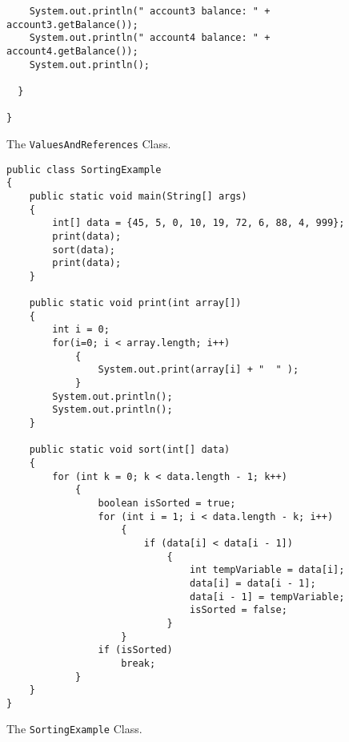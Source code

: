 \documentclass[12pt]{article}
\begin{document}
\begin{enumerate}
\begin{figure}[t]
{\begin{verbatim}
    System.out.println(" account3 balance: " + account3.getBalance());
    System.out.println(" account4 balance: " + account4.getBalance());
    System.out.println();

  }

}
\end{verbatim}
}

\caption{The {\tt ValuesAndReferences} Class.}
\label{ValuesAndReferences}
\end{figure}

\begin{figure}[t]

\footnotesize{
\begin{verbatim}
public class SortingExample
{
    public static void main(String[] args)
    {
        int[] data = {45, 5, 0, 10, 19, 72, 6, 88, 4, 999};
        print(data);
        sort(data);
        print(data);
    }

    public static void print(int array[])
    {
        int i = 0;
        for(i=0; i < array.length; i++)
            {
                System.out.print(array[i] + "  " );
            }
        System.out.println();
        System.out.println();
    }

    public static void sort(int[] data)
    {
        for (int k = 0; k < data.length - 1; k++)
            {
                boolean isSorted = true;
                for (int i = 1; i < data.length - k; i++)
                    {
                        if (data[i] < data[i - 1])
                            {
                                int tempVariable = data[i];
                                data[i] = data[i - 1];
                                data[i - 1] = tempVariable;
                                isSorted = false;
                            }
                    }
                if (isSorted)
                    break;
            }
    }
}
\end{verbatim}
}

\caption{The {\tt SortingExample} Class.}
\label{SortingExample}
\end{figure}

% 
% 
% 
% 
% 


\end{enumerate}
\end{document}
